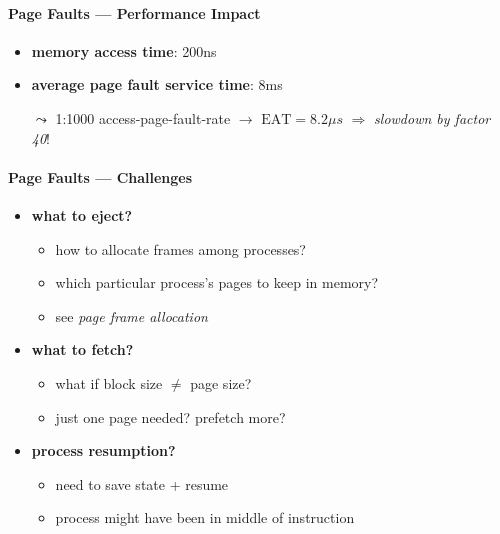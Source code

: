 \paragraph{Page Faults --- Performance Impact}
\begin{itemize}
  \item \textbf{memory access time}: 200ns
  \item \textbf{average page fault service time}: 8ms
  \item[$ \leadsto $] 1:1000 access-page-fault-rate $ \to $ $ \text{EAT} = 8.2\mu s $ $ \Rightarrow $ \emph{slowdown by factor 40}!
\end{itemize}

\paragraph{Page Faults --- Challenges}
\begin{itemize}
  \item \textbf{what to eject?}
  \begin{itemize}
    \item how to allocate frames among processes?
    \item which particular process's pages to keep in memory?
    \item see \emph{page frame allocation}
  \end{itemize}
  \item \textbf{what to fetch?}
  \begin{itemize}
    \item what if block size $ \neq $ page size?
    \item just one page needed? prefetch more?
  \end{itemize}
  \item \textbf{process resumption?}
  \begin{itemize}
    \item need to save state + resume
    \item process might have been in middle of instruction
  \end{itemize}
\end{itemize}

